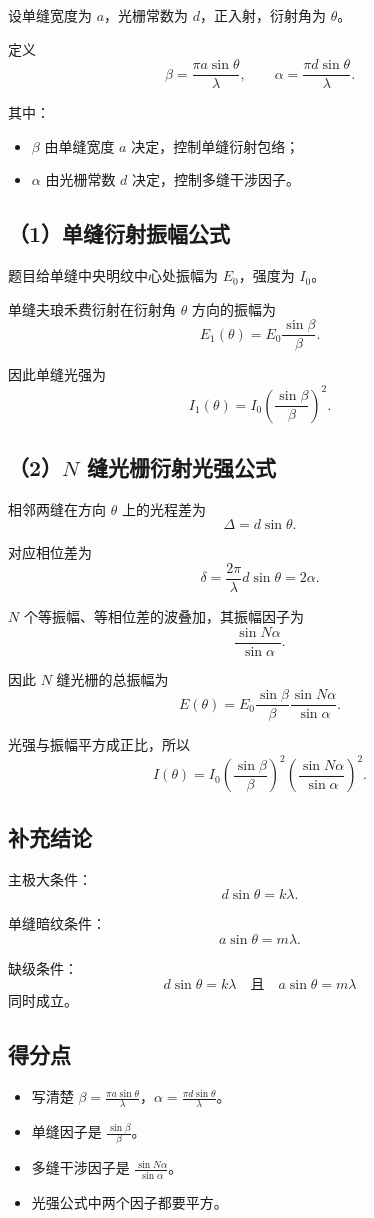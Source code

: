 \documentclass[12pt,a4paper]{ctexart}
\begin{document}
设单缝宽度为 $a$，光栅常数为 $d$，正入射，衍射角为 $\theta$。

定义
\[
\beta=\frac{\pi a\sin\theta}{\lambda},
\qquad
\alpha=\frac{\pi d\sin\theta}{\lambda}.
\]

其中：
\begin{itemize}
  \item $\beta$ 由单缝宽度 $a$ 决定，控制单缝衍射包络；
  \item $\alpha$ 由光栅常数 $d$ 决定，控制多缝干涉因子。
\end{itemize}

\subsection*{（1）单缝衍射振幅公式}

题目给单缝中央明纹中心处振幅为 $E_0$，强度为 $I_0$。

单缝夫琅禾费衍射在衍射角 $\theta$ 方向的振幅为
\[
\boxed{
E_1(\theta)=E_0\frac{\sin\beta}{\beta}
}.
\]

因此单缝光强为
\[
\boxed{
I_1(\theta)=I_0\left(\frac{\sin\beta}{\beta}\right)^2
}.
\]

\subsection*{（2）$N$ 缝光栅衍射光强公式}

相邻两缝在方向 $\theta$ 上的光程差为
\[
\Delta=d\sin\theta.
\]

对应相位差为
\[
\delta=\frac{2\pi}{\lambda}d\sin\theta=2\alpha.
\]

$N$ 个等振幅、等相位差的波叠加，其振幅因子为
\[
\frac{\sin N\alpha}{\sin\alpha}.
\]

因此 $N$ 缝光栅的总振幅为
\[
\boxed{
E(\theta)=
E_0\frac{\sin\beta}{\beta}
\frac{\sin N\alpha}{\sin\alpha}
}.
\]

光强与振幅平方成正比，所以
\[
\boxed{
I(\theta)=
I_0
\left(\frac{\sin\beta}{\beta}\right)^2
\left(\frac{\sin N\alpha}{\sin\alpha}\right)^2
}.
\]

\subsection*{补充结论}

主极大条件：
\[
d\sin\theta=k\lambda.
\]

单缝暗纹条件：
\[
a\sin\theta=m\lambda.
\]

缺级条件：
\[
d\sin\theta=k\lambda
\quad\text{且}\quad
a\sin\theta=m\lambda
\]
同时成立。

\subsection*{得分点}

\begin{itemize}
  \item 写清楚 $\beta=\frac{\pi a\sin\theta}{\lambda}$，$\alpha=\frac{\pi d\sin\theta}{\lambda}$。
  \item 单缝因子是 $\frac{\sin\beta}{\beta}$。
  \item 多缝干涉因子是 $\frac{\sin N\alpha}{\sin\alpha}$。
  \item 光强公式中两个因子都要平方。
\end{itemize}
\end{document}
